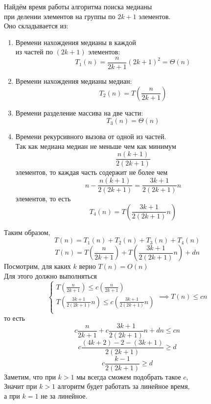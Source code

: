 \documentclass[12pt]{article}
\begin{document}
	\large
	Найдём время работы алгоритма поиска медианы \\
	при делении элементов на группы по $2k+1$ элементов. \\
	Оно складывается из:
	\begin{enumerate}
		\item
			Времени нахождения медианы в каждой \\
			из частей по $(2k+1)$ элементов:
			$$T_1(n)=\frac{n}{2k+1}(2k+1)^2=\Theta(n)$$
		\item
			Времени нахождения медианы медиан:
			$$T_2(n)=T(\frac{n}{2k+1})$$
		\item
			Времени разделение массива на две части:
			$$T_3(n) = \Theta(n)$$
		\item
			Времени рекурсивного вызова от одной из частей.\\
			Так как медиана медиан не меньше чем как минимум
			$$\frac{n(k+1)}{2(2k+1)}$$ элементов, 
			то каждая часть содержит не более чем
			$$n-\frac{n(k+1)}{2(2k+1)}=\frac{3k+1}{2(2k+1)}n$$ элементов, то есть
			$$T_4(n)=T(\frac{3k+1}{2(2k+1)}n)$$
	\end{enumerate}
	\newpage
	Таким образом,
	$$T(n)=T_1(n)+T_2(n)+T_3(n)+T_4(n)$$
	$$T(n)=T(\frac{n}{2k+1})+T(\frac{3k+1}{2(2k+1)}n)+dn$$
	Посмотрим, для каких $k$ верно $T(n) = O(n)$\\
	Для этого должно выполняться
	$$\begin{cases}
			T(\frac{n}{2k+1}) \leq c(\frac{n}{2k+1})\\
			T(\frac{3k+1}{2(2k+1)}n) \leq c(\frac{3k+1}{2(2k+1)}n)\\
		\end{cases}
	\implies T(n) \leq cn$$
	то есть
	$$c\frac{n}{2k+1}+c\frac{3k+1}{2(2k+1)}n+dn \leq cn$$
	$$c\frac{(4k+2)-2-(3k+1)}{2(2k+1)} \geq d$$
	$$c\frac{k-1}{2(2k+1)} \geq d$$
	Заметим, что при $k > 1$ мы всегда сможем подобрать такое $c$,\\
	Значит при $k>1$ алгоритм будет работать за линейное время,\\
	а при $k=1$ не за линейное.
\end{document}
